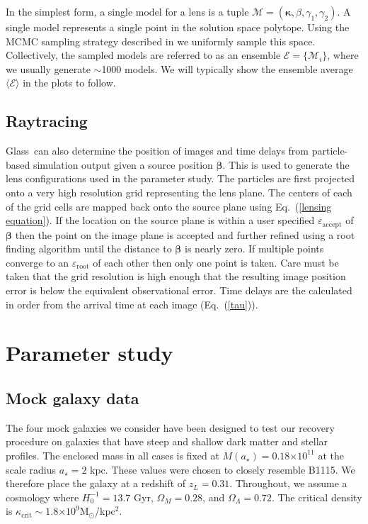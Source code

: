 \documentclass[onecolumn,galley]{mn2e}
\newcommand{\Glass}{{\sc Glass}}
\newcommand{\M}{\ensuremath{\mathscr{M}}}
\newcommand{\E}{\ensuremath{\mathscr{E}}}
\newcommand{\eps}{\ensuremath{\varepsilon}}
\newcommand{\Eavg}{\ensuremath{\langle \E \rangle}}
\newcommand{\Msun}{\ensuremath{\mathrm{M}_\odot}}
\newcommand{\eqnref}[1] {Eq.~(\ref{#1})}
\newcommand{\e}[1]{\ensuremath{\times 10^{#1}}}
\renewcommand{\vec}[1]{\ensuremath{\boldsymbol{#1}}}
\begin{document}
In the simplest form, a single model for a lens is a tuple $\M = (\vec\kappa,
\beta, \gamma_1, \gamma_2)$. A single model represents a single point in the
solution space polytope. Using the MCMC sampling strategy described in \cite{}
we uniformly sample this space. Collectively, the sampled models are referred
to as an ensemble $\E = \{\M_i\}$, where we usually generate $\sim$1000 models. We
will typically show the ensemble average $\Eavg$ in the plots to
follow.



\subsection{Raytracing}
\label{Raytracing}
\Glass\ can also determine the position of images and time delays from 
particle-based simulation output given a source position $\vec\beta$. This is
used to generate the lens configurations used in the parameter study.  The
particles are first projected onto a very high resolution grid representing the
lens plane. The centers of each of the grid cells are mapped back onto the
source plane using \eqnref{lensing equation}. If the location on the source
plane is within a user specified $\eps_\mathrm{accept}$ of $\vec\beta$ then the
point on the image plane is accepted and further refined using a root finding
algorithm until the distance to $\vec\beta$ is nearly zero. If multiple points
converge to an $\eps_\mathrm{root}$ of each other then only one point is taken.
Care must be taken that the grid resolution is high enough that the resulting
image position error is below the equivalent observational error. Time delays
are the calculated in order from the arrival time at each image (\eqnref{tau}).

\section{Parameter study}

\subsection{Mock galaxy data}

The four mock galaxies we consider have been designed to test our recovery
procedure on galaxies that have steep and shallow dark matter and stellar
profiles. The enclosed mass in all cases is fixed at $M(a_\star)= 0.18\e{11}$
at the scale radius $a_\star=2$ kpc. These values were chosen to closely
resemble B1115. We therefore place the galaxy at a redshift of $z_L = 0.31$.
Throughout, we assume a cosmology where $H_0^{-1}=13.7$ Gyr, $\Omega_M=0.28$,
and $\Omega_\Lambda=0.72$. The critical density is $\kappa_\mathrm{crit}\sim
1.8\e{9}$\Msun/kpc$^2$.
\end{document}
